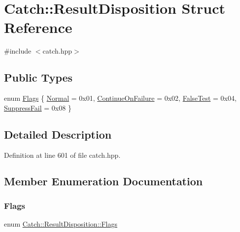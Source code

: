 \hypertarget{struct_catch_1_1_result_disposition}{}\section{Catch\+:\+:Result\+Disposition Struct Reference}
\label{struct_catch_1_1_result_disposition}


{\ttfamily \#include $<$catch.\+hpp$>$}

\subsection*{Public Types}
\begin{DoxyCompactItemize}
\item 
enum \mbox{\hyperlink{struct_catch_1_1_result_disposition_a3396cad6e2259af326b3aae93e23e9d8}{Flags}} \{ \mbox{\hyperlink{struct_catch_1_1_result_disposition_a3396cad6e2259af326b3aae93e23e9d8af3bd52347ed6f8796e8ce2f77bb39ea5}{Normal}} = 0x01, 
\mbox{\hyperlink{struct_catch_1_1_result_disposition_a3396cad6e2259af326b3aae93e23e9d8aa18c94bd60c5614e17a84c2ced3bbfd5}{Continue\+On\+Failure}} = 0x02, 
\mbox{\hyperlink{struct_catch_1_1_result_disposition_a3396cad6e2259af326b3aae93e23e9d8a9980604245f19884691f941dec03eeb8}{False\+Test}} = 0x04, 
\mbox{\hyperlink{struct_catch_1_1_result_disposition_a3396cad6e2259af326b3aae93e23e9d8a1a88eb6004bddee4ccae4b421991bf54}{Suppress\+Fail}} = 0x08
 \}
\end{DoxyCompactItemize}


\subsection{Detailed Description}


Definition at line 601 of file catch.\+hpp.



\subsection{Member Enumeration Documentation}
\mbox{\label{struct_catch_1_1_result_disposition_a3396cad6e2259af326b3aae93e23e9d8}} 
\subsubsection{\texorpdfstring{Flags}{Flags}}
{\footnotesize\ttfamily enum \mbox{\hyperlink{struct_catch_1_1_result_disposition_a3396cad6e2259af326b3aae93e23e9d8}{Catch\+::\+Result\+Disposition\+::\+Flags}}}

